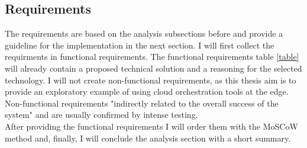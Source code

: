 \subsection{Requirements}
The requirements are based on the analysis subsections before and provide a guideline for the implementation in the next section. I will first collect the requirments in functional requirements. The functional requirements table \cref{table} will already contain a proposed technical solution and a reasoning for the selected technology. I will not create non-functional requirements, as this thesis aim is to provide an exploratory example of using cloud orchestration tools at the edge. Non-functional requirements "indirectly related to the overall success of the system"\cite{aauFunctionalRequirements} and are usually confirmed by intense testing.\\
After providing the functional requirements I will order them with the MoSCoW method\cite{clegg1994caseMoSCoWMethod} and, finally, I will conclude the analysis section with a short summary.



